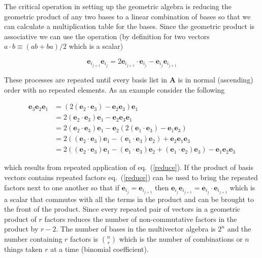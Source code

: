 \documentclass[12pt]{report}
\newcommand{\bm}[1]{\boldsymbol{#1}}
\newcommand{\lp}{\left (}
\newcommand{\rp}{\right )}
\newcommand{\paren}[1]{\lp {#1} \rp}
\newcommand{\eb}{\bm{e}}
\begin{document}
The critical operation in setting up the geometric algebra is reducing
the geometric product of any two bases to a linear combination of bases so that
we can calculate a multiplication table for the bases.  Since the geometric
product is associative we can use the operation (by definition for two vectors
$a\cdot b \equiv (ab+ba)/2$  which is a scalar)

   \begin{equation}\label{reduce}
      \eb_{i_{j+1}}\eb_{i_{j}} = 2\eb_{i_{j+1}}\cdot \eb_{i_{j}} - \eb_{i_{j}}\eb_{i_{j+1}}
   \end{equation}

These processes are repeated until every basis list in $\bm{A}$ is in normal
(ascending) order with no repeated elements. As an example consider the
following

   \begin{align}
      \eb_{3}\eb_{2}\eb_{1} &= (2(\eb_{2}\cdot \eb_{3}) - \eb_{2}\eb_{3})\eb_{1} \\
                      &= 2\paren{\eb_{2}\cdot \eb_{3}}\eb_{1} - \eb_{2}\eb_{3}\eb_{1} \\
                      &= 2\paren{\eb_{2}\cdot \eb_{3}}\eb_{1} - \eb_{2}\paren{2\paren{\eb_{1}\cdot \eb_{3}}-\eb_{1}\eb_{3}} \\
                      &= 2\paren{\paren{\eb_{2}\cdot \eb_{3}}\eb_{1}-\paren{\eb_{1}\cdot \eb_{3}}\eb_{2}}+\eb_{2}\eb_{1}\eb_{3} \\
                      &= 2\paren{\paren{\eb_{2}\cdot \eb_{3}}\eb_{1}-\paren{\eb_{1}\cdot \eb_{3}}\eb_{2}+
                         \paren{\eb_{1}\cdot \eb_{2}}\eb_{3}}-\eb_{1}\eb_{2}\eb_{3}
   \end{align}

which results from repeated application of eq.~(\ref{reduce}).  If the product of basis vectors contains repeated factors
eq.~(\ref{reduce}) can be used to bring the repeated factors next to one another so that if $\eb_{i_{j}} = \eb_{i_{j+1}}$
then $\eb_{i_{j}}\eb_{i_{j+1}} = \eb_{i_{j}}\cdot \eb_{i_{j+1}}$ which is a scalar that commutes with all the terms in the product
and can be brought to the front of the product.  Since every repeated pair of vectors in a geometric product of $r$ factors
reduces the number of non-commutative factors in the product by $r-2$. The number of bases in the multivector algebra is $2^{n}$
and the number containing $r$ factors is ${n\choose r}$ which is the number of combinations or $n$ things
taken $r$ at a time (binomial coefficient).
\end{document}
